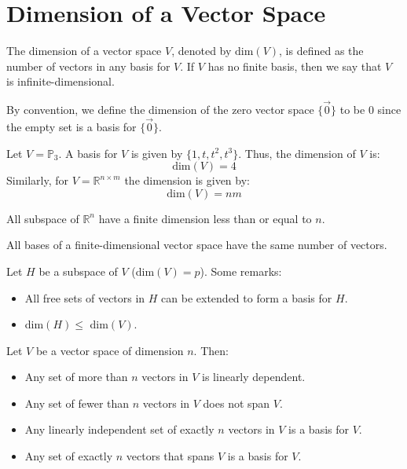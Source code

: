 \section{Dimension of a Vector Space}
\begin{definition}[Dimension]
    The dimension of a vector space $V$, denoted by $\text{dim}(V)$, is defined as the number of vectors in any basis for $V$. If $V$ has no finite basis, then we say that $V$ is infinite-dimensional.
\end{definition}
By convention, we define the dimension of the zero vector space $\{\vec{0}\}$ to be $0$ since the empty set is a basis for $\{\vec{0}\}$.

\begin{eg}
    Let $V = \mathbb{P}_3$. A basis for $V$ is given by $\{1, t, t^2, t^3\}$. Thus, the dimension of $V$ is:
    \[ \text{dim}(V) = 4 \]
    Similarly, for $V = \mathbb{R}^{n \times m}$ the dimension is given by:
    \[ \text{dim}(V) = nm \]
\end{eg}
All subspace of $\mathbb{R}^n$ have a finite dimension less than or equal to $n$.

\begin{theorem}
    All bases of a finite-dimensional vector space have the same number of vectors.
\end{theorem}
Let $H$ be a subspace of $V$ (dim$(V) = p$). Some remarks:
\begin{itemize}[itemsep=1pt,label=$\circ$]
    \item All free sets of vectors in $H$ can be extended to form a basis for $H$.
    \item dim$(H) \leq$ dim$(V)$.
\end{itemize}

\begin{theorem}
    Let $V$ be a vector space of dimension $n$. Then:
    \begin{itemize}[itemsep=1pt,label=$\circ$]
        \item Any set of more than $n$ vectors in $V$ is linearly dependent.
        \item Any set of fewer than $n$ vectors in $V$ does not span $V$.
        \item Any linearly independent set of exactly $n$ vectors in $V$ is a basis for $V$.
        \item Any set of exactly $n$ vectors that spans $V$ is a basis for $V$.
    \end{itemize}
\end{theorem}

